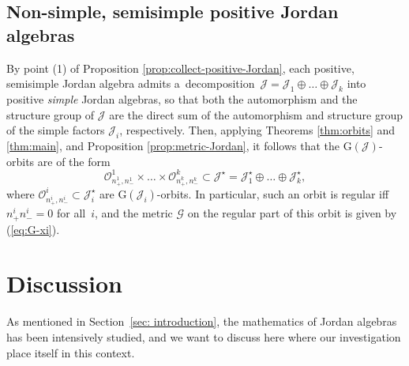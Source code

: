 \documentclass[pdftex]{sigma}
\numberwithin{equation}{section}
\newcommand{\ocal}{\mathcal{O}}
\newcommand{\Jcal}{\mathcal{J}}
\newcommand{\G}{\mathrm{G}}
\newcommand{\Gcal}{\mathcal{G}}
\begin{document}
\subsection{Non-simple, semisimple positive Jordan algebras}

By point (1) of Proposition \ref{prop:collect-positive-Jordan}, each positive, semisimple Jordan algebra admits a~decomposition~$\Jcal = \Jcal_1 \oplus \dots \oplus \Jcal_k$ into positive {\em simple }Jordan algebras, so that both the automorphism and the structure group of $\Jcal$ are the direct sum of the automorphism and structure group of the simple factors $\Jcal_i$, respectively.
Then, applying Theorems \ref{thm:orbits} and \ref{thm:main}, and Proposition \ref{prop:metric-Jordan}, it follows that the $\G(\Jcal)$-orbits are of the form
\[
\ocal^1_{n^1_+, n^1_-} \times \dots \times \ocal^k_{n^k_+, n^k_-} \subset \Jcal^\star = \Jcal_1^\star \oplus \dots \oplus \Jcal^\star_k,
\]
where $\ocal^i_{n^i_+, n^i_-} \subset \Jcal^\star_i$ are $\G(\Jcal_i)$-orbits. In particular, such an orbit is regular iff $n^i_+ n^i_- = 0$ for all~$i$, and the metric $\Gcal$ on the regular part of this orbit is given by (\ref{eq:G-xi}).



\section{Discussion} \label{sec: conclusions}

As mentioned in Section~\ref{sec: introduction}, the mathematics of Jordan algebras has been intensively studied, and we want to discuss here where our investigation place itself in this context.
\end{document}
